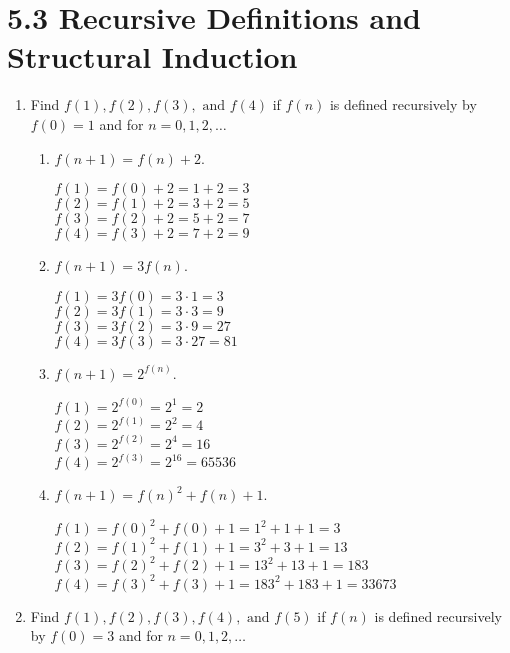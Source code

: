 \documentclass[11pt]{article}
\begin{document}
\section*{\textbf{5.3 Recursive Definitions and Structural Induction}}
\begin{enumerate}[label=\textbf{\arabic*.}]
	\item Find $f(1), f(2), f(3), \text{ and } f(4)$ if $f(n)$ is defined recursively by $f(0) = 1$ and for $n = 0, 1, 2, \ldots$
	
	\begin{enumerate}[label=\textbf{\alph*)}]
		\item $f(n + 1) = f(n) + 2$.
		
		$f(1) = f(0) + 2 = 1 + 2 = 3$ \\
		$f(2) = f(1) + 2 = 3 + 2 = 5$ \\
		$f(3) = f(2) + 2 = 5 + 2 = 7$ \\
		$f(4) = f(3) + 2 = 7 + 2 = 9$
		
		\item $f(n + 1) = 3f(n)$.
		
		$f(1) = 3f(0) = 3 \cdot 1 = 3$ \\
		$f(2) = 3f(1) = 3 \cdot 3 = 9$ \\
		$f(3) = 3f(2) = 3 \cdot 9 = 27$ \\
		$f(4) = 3f(3) = 3 \cdot 27 = 81$
		
		\item $f(n + 1) = 2^{f(n)}$.
		
		$f(1) = 2^{f(0)} = 2^1 = 2$ \\
		$f(2) = 2^{f(1)} = 2^2 = 4$ \\
		$f(3) = 2^{f(2)} = 2^4 = 16$ \\
		$f(4) = 2^{f(3)} = 2^{16} = 65536$
		
		\item $f(n + 1) = f(n)^2 + f(n) + 1$.
		
		$f(1) = f(0)^2 + f(0) + 1 = 1^2 + 1 + 1 = 3$ \\
		$f(2) = f(1)^2 + f(1) + 1 = 3^2 + 3 + 1 = 13$ \\
		$f(3) = f(2)^2 + f(2) + 1 = 13^2 + 13 + 1 = 183$ \\
		$f(4) = f(3)^2 + f(3) + 1 = 183^2 + 183 + 1 = 33673$
	\end{enumerate}

	\item Find $f(1), f(2), f(3), f(4), \text{ and } f(5)$ if $f(n)$ is defined recursively by $f(0) = 3$ and for $n = 0, 1, 2, \ldots$
	

\end{enumerate}
\end{document}

